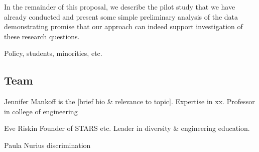  
 In the remainder of this proposal, we describe the pilot study that we have already conducted and present some simple preliminary analysis of the data demonstrating promise that our approach can indeed support investigation of these research questions.

Policy, students, minorities, etc.
 
\subsection{Team}
 
Jennifer Mankoff is the [brief bio \& relevance to topic]. Expertise in xx. Professor in college of engineering 
 
Eve Riskin Founder of STARS etc. Leader in diversity & engineering education.
 
Paula Nurius discrimination
